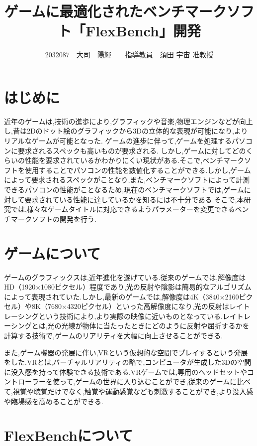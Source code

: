 \documentclass[twocolumn,10pt,a4j]{ltjsarticle}
\title{ゲームに最適化されたベンチマークソフト「FlexBench」開発}
\author{2032087　大司　陽輝　　指導教員　須田 宇宙 准教授}
\date{}
\begin{document}
\maketitle

\section{はじめに}
 
近年のゲームは,技術の進歩により,グラフィックや音楽,物理エンジンなどが向上し,昔は2Dのドット絵のグラフィックから3Dの立体的な表現が可能になり,よりリアルなゲームが可能となった.
ゲームの進歩に伴って,ゲームを処理するパソコンに要求されるスペックも高いものが要求される.
しかし,ゲームに対してどのくらいの性能を要求されているかわかりにくい現状がある.そこで,ベンチマークソフトを使用することでパソコンの性能を数値化することができる.しかし,ゲームによって要求されるスペックがことなり,また,ベンチマークソフトによって計測できるパソコンの性能がことなるため,現在のベンチマークソフトでは,ゲームに対して要求されている性能に達しているかを知るには不十分である.そこで,本研究では,様々なゲームタイトルに対応できるようパラメーターを変更できるベンチマークソフトの開発を行う.

\section{ゲームについて}
ゲームのグラフィックスは,近年進化を遂げている.従来のゲームでは,解像度はHD（1920×1080ピクセル）程度であり,光の反射や陰影は簡易的なアルゴリズムによって表現されていた.しかし,最新のゲームでは,解像度は4K（3840×2160ピクセル）や8K（7680×4320ピクセル）といった高解像度になり,光の反射はレイトレーシングという技術により,より実際の映像に近いものとなっている.レイトレーシングとは,光の光線が物体に当たったときにどのように反射や屈折するかを計算する技術で,ゲームのリアリティを大幅に向上させることができる.

また,ゲーム機器の発展に伴い,VRという仮想的な空間でプレイするという発展をした.VRとは,バーチャルリアリティの略で,コンピュータが生成した3Dの空間に没入感を持って体験できる技術である.VRゲームでは,専用のヘッドセットやコントローラーを使って,ゲームの世界に入り込むことができ,従来のゲームに比べて,視覚や聴覚だけでなく,触覚や運動感覚なども刺激することができ,より没入感や臨場感を高めることができる.

\section{FlexBenchについて}
\end{document}
